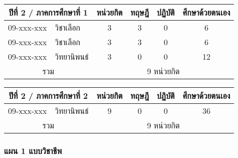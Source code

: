 \vspace{5ex}\par\noindent
\begin{tabular}{|cp{}|cccc|}
\hline
\multicolumn{2}{|c|}{ปีที่ 2 / ภาคการศึกษาที่ 1} & \multicolumn{1}{c|}{หน่วยกิต} & \multicolumn{1}{c|}{ทฤษฎี} & \multicolumn{1}{c|}{ปฏิบัติ} & ศึกษาด้วยตนเอง \\ \hline
\multicolumn{1}{|c|}{09-xxx-xxx}  & วิชาเลือก  & \multicolumn{1}{c|}{3}        & \multicolumn{1}{c|}{3}     & \multicolumn{1}{c|}{0}       & 6             \\ \hline
\multicolumn{1}{|c|}{09-xxx-xxx}  & วิชาเลือก  & \multicolumn{1}{c|}{3}        & \multicolumn{1}{c|}{3}     & \multicolumn{1}{c|}{0}       & 6             \\ \hline
\multicolumn{1}{|c|}{09-xxx-xxx}  & วิทยานิพนธ์  & \multicolumn{1}{c|}{3}        & \multicolumn{1}{c|}{0}     & \multicolumn{1}{c|}{0}       & 12             \\ \hline
\multicolumn{2}{|c|}{รวม}                        & \multicolumn{4}{c|}{9 หน่วยกิต}                                                                            \\ \hline
\end{tabular}

\vspace{5ex}\par\noindent
\begin{tabular}{|cp{}|cccc|}
\hline
\multicolumn{2}{|c|}{ปีที่ 2 / ภาคการศึกษาที่ 2} & \multicolumn{1}{c|}{หน่วยกิต} & \multicolumn{1}{c|}{ทฤษฎี} & \multicolumn{1}{c|}{ปฏิบัติ} & ศึกษาด้วยตนเอง \\ \hline
\multicolumn{1}{|c|}{09-xxx-xxx}  & วิทยานิพนธ์  & \multicolumn{1}{c|}{9}        & \multicolumn{1}{c|}{0}     & \multicolumn{1}{c|}{0}       & 36             \\ \hline
\multicolumn{2}{|c|}{รวม}                        & \multicolumn{4}{c|}{9 หน่วยกิต}                                                                            \\ \hline
\end{tabular}


\newpage
\subsubsection*{แผน 1 แบบวิชาชีพ}

